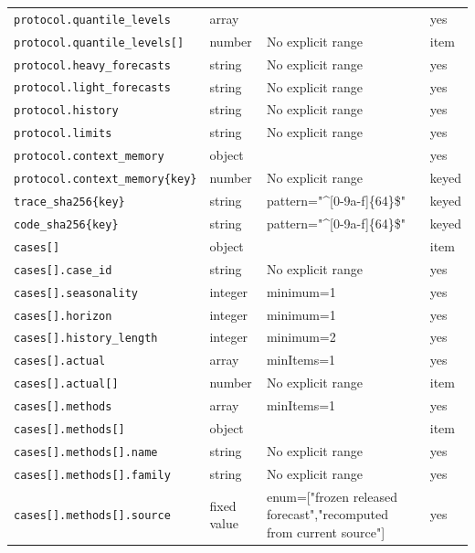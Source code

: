 \begin{longtable}{@{}p{}p{}p{}p{}@{}}
\texttt{protocol.\allowbreak{}quantile\_\allowbreak{}levels} & array &  & yes\\
\texttt{protocol.\allowbreak{}quantile\_\allowbreak{}levels[]} & number & No explicit range & item\\
\texttt{protocol.\allowbreak{}heavy\_\allowbreak{}forecasts} & string & No explicit range & yes\\
\texttt{protocol.\allowbreak{}light\_\allowbreak{}forecasts} & string & No explicit range & yes\\
\texttt{protocol.\allowbreak{}history} & string & No explicit range & yes\\
\texttt{protocol.\allowbreak{}limits} & string & No explicit range & yes\\
\texttt{protocol.\allowbreak{}context\_\allowbreak{}memory} & object &  & yes\\
\texttt{protocol.\allowbreak{}context\_\allowbreak{}memory\{key\}} & number & No explicit range & keyed\\
\texttt{trace\_\allowbreak{}sha256\{key\}} & string & pattern="\textasciicircum{}[0-9a-f]\{64\}\$" & keyed\\
\texttt{code\_\allowbreak{}sha256\{key\}} & string & pattern="\textasciicircum{}[0-9a-f]\{64\}\$" & keyed\\
\texttt{cases[]} & object &  & item\\
\texttt{cases[].\allowbreak{}case\_\allowbreak{}id} & string & No explicit range & yes\\
\texttt{cases[].\allowbreak{}seasonality} & integer & minimum=1 & yes\\
\texttt{cases[].\allowbreak{}horizon} & integer & minimum=1 & yes\\
\texttt{cases[].\allowbreak{}history\_\allowbreak{}length} & integer & minimum=2 & yes\\
\texttt{cases[].\allowbreak{}actual} & array & minItems=1 & yes\\
\texttt{cases[].\allowbreak{}actual[]} & number & No explicit range & item\\
\texttt{cases[].\allowbreak{}methods} & array & minItems=1 & yes\\
\texttt{cases[].\allowbreak{}methods[]} & object &  & item\\
\texttt{cases[].\allowbreak{}methods[].\allowbreak{}name} & string & No explicit range & yes\\
\texttt{cases[].\allowbreak{}methods[].\allowbreak{}family} & string & No explicit range & yes\\
\texttt{cases[].\allowbreak{}methods[].\allowbreak{}source} & fixed value & enum=["frozen released forecast","recomputed from current source"] & yes\\

\end{longtable}
